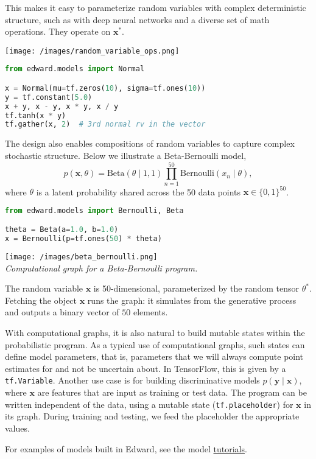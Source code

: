 
This makes it easy to parameterize random variables with complex deterministic
structure, such as with deep neural networks and a diverse set of math
operations.
They operate on $\mathbf{x}^*$.

\texttt{[image: /images/random\_variable\_ops.png]}

\begin{lstlisting}[language=Python]
from edward.models import Normal

x = Normal(mu=tf.zeros(10), sigma=tf.ones(10))
y = tf.constant(5.0)
x + y, x - y, x * y, x / y
tf.tanh(x * y)
tf.gather(x, 2)  # 3rd normal rv in the vector
\end{lstlisting}

The design also enables compositions of random variables
to capture complex stochastic structure.
%
Below we illustrate a Beta-Bernoulli model,
\begin{equation*}
p(\mathbf{x}, \theta) =
\text{Beta}(\theta\mid 1, 1)
\prod_{n=1}^{50} \text{Bernoulli}(x_n\mid \theta),
\end{equation*}
where $\theta$
is a latent probability shared across the 50 data points $\mathbf{x}\in\{0,1\}^{50}$.

\begin{lstlisting}[language=python]
from edward.models import Bernoulli, Beta

theta = Beta(a=1.0, b=1.0)
x = Bernoulli(p=tf.ones(50) * theta)
\end{lstlisting}

\texttt{[image: /images/beta\_bernoulli.png]} \\
{\small\textit{%
Computational graph for a Beta-Bernoulli program.
}}

The random variable $\mathbf{x}$ is 50-dimensional, parameterized by the
random tensor $\theta^*$. Fetching the object $\mathbf{x}$ runs the
graph: it simulates from the generative process and
outputs a binary vector of $50$ elements.

With computational graphs, it is also natural to build mutable states
within the probabilistic program. As a typical use of computational
graphs, such states can define model parameters, that is, parameters
that we will always compute point estimates for and not be uncertain
about. In TensorFlow, this
is given by a \texttt{tf.Variable}. Another use case is for building
discriminative models $p(\mathbf{y}\mid\mathbf{x})$, where
$\mathbf{x}$ are features that are input as training or test data.  The
program can be written independent of the data, using a mutable state
(\texttt{tf.placeholder}) for $\mathbf{x}$ in its graph.
During training and testing, we feed the placeholder the appropriate
values.

For examples of models built in Edward, see the model
\href{/tutorials/}{tutorials}.
